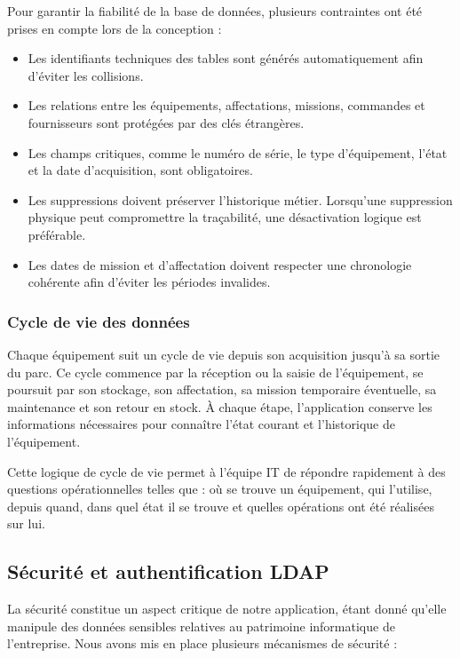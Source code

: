 Pour garantir la fiabilité de la base de données, plusieurs contraintes ont été prises en compte lors de la conception :

\begin{itemize}[label=\textbullet,font=\normalsize]
    \item Les identifiants techniques des tables sont générés automatiquement afin d'éviter les collisions.
    \item Les relations entre les équipements, affectations, missions, commandes et fournisseurs sont protégées par des clés étrangères.
    \item Les champs critiques, comme le numéro de série, le type d'équipement, l'état et la date d'acquisition, sont obligatoires.
    \item Les suppressions doivent préserver l'historique métier. Lorsqu'une suppression physique peut compromettre la traçabilité, une désactivation logique est préférable.
    \item Les dates de mission et d'affectation doivent respecter une chronologie cohérente afin d'éviter les périodes invalides.
\end{itemize}

\subsubsection{Cycle de vie des données}

Chaque équipement suit un cycle de vie depuis son acquisition jusqu'à sa sortie du parc. Ce cycle commence par la réception ou la saisie de l'équipement, se poursuit par son stockage, son affectation, sa mission temporaire éventuelle, sa maintenance et son retour en stock. À chaque étape, l'application conserve les informations nécessaires pour connaître l'état courant et l'historique de l'équipement.

Cette logique de cycle de vie permet à l'équipe IT de répondre rapidement à des questions opérationnelles telles que : où se trouve un équipement, qui l'utilise, depuis quand, dans quel état il se trouve et quelles opérations ont été réalisées sur lui.

\subsection{Sécurité et authentification LDAP}

La sécurité constitue un aspect critique de notre application, étant donné qu'elle manipule des données sensibles relatives au patrimoine informatique de l'entreprise. Nous avons mis en place plusieurs mécanismes de sécurité :

